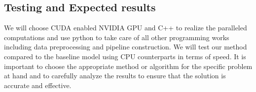\documentclass{article}
\begin{document}
\subsection{Testing and Expected results}

We will choose CUDA enabled NVIDIA GPU and C++ to realize the paralleled computations and use python 
to take care of all other programming works including data preprocessing and pipeline construction. 
We will test our method compared to the baseline model using CPU counterparts in terms of speed. 
It is important to choose the appropriate method or algorithm for the specific problem at hand and to 
carefully analyze the results to ensure that the solution is accurate and effective. 

\begin{comment}
\section{Submission of papers to NeurIPS 2020}

NeurIPS requires electronic submissions.  The electronic submission site is
\begin{center}
  \url{https://cmt3.research.microsoft.com/NeurIPS2020/}
\end{center}

Please read the instructions below carefully and follow them faithfully.

\subsection{Style}

Papers to be submitted to NeurIPS 2020 must be prepared according to the
instructions presented here. Papers may only be up to eight pages long,
including figures. Additional pages \emph{containing only a section on the broader impact, acknowledgments and/or cited references} are allowed. Papers that exceed eight pages of content will not be reviewed, or in any other way considered for
presentation at the conference.

The margins in 2020 are the same as those in 2007, which allow for $\sim$$15\%$
more words in the paper compared to earlier years.

Authors are required to use the NeurIPS \LaTeX{} style files obtainable at the
NeurIPS website as indicated below. Please make sure you use the current files
and not previous versions. Tweaking the style files may be grounds for
rejection.


\end{comment}
\end{document}
